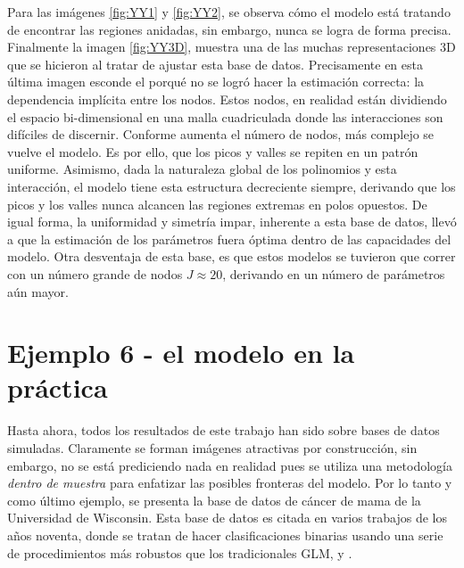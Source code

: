 \documentclass[../Main/Main.tex]{subfiles}
\begin{document}
Para las imágenes \ref{fig:YY1} y \ref{fig:YY2}, se observa cómo el modelo está tratando de encontrar las regiones anidadas, sin embargo, nunca se logra de forma precisa. Finalmente la imagen \ref{fig:YY3D}, muestra una de las muchas representaciones 3D que se hicieron al tratar de ajustar esta base de datos. Precisamente en esta última imagen esconde el porqué no se logró hacer la estimación correcta: la dependencia implícita entre los nodos. Estos nodos, en realidad están dividiendo el espacio bi-dimensional en una malla cuadriculada donde las interacciones son difíciles de discernir. Conforme aumenta el número de nodos, más complejo se vuelve el modelo. Es por ello, que los picos y valles se repiten en un patrón uniforme. Asimismo, dada la naturaleza global de los polinomios y esta interacción, el modelo tiene esta estructura decreciente siempre, derivando que los picos y los valles nunca alcancen las regiones extremas en polos opuestos. De igual forma, la uniformidad y simetría impar, inherente a esta base de datos, llevó a que la estimación de los parámetros fuera óptima dentro de las capacidades del modelo. Otra desventaja de esta base, es que estos modelos se tuvieron que correr con un número grande de nodos $J \approx 20$, derivando en un número de parámetros aún mayor.

\section{Ejemplo 6 - el modelo en la práctica} \label{sec:T6}
Hasta ahora, todos los resultados de este trabajo han sido sobre bases de datos simuladas. Claramente  se forman imágenes atractivas por construcción, sin embargo, no se está prediciendo nada en realidad pues se utiliza una metodología \textit{dentro de muestra} para enfatizar las posibles fronteras del modelo. Por lo tanto y como último ejemplo, se presenta la base de datos de cáncer de mama de la Universidad de Wisconsin. Esta base de datos es citada en varios trabajos de los años noventa, donde se tratan de hacer clasificaciones binarias usando una serie de procedimientos más robustos que los tradicionales GLM,  \citet{mangasarian1990pattern} y \citet{bennett1992robust}.
\end{document}
